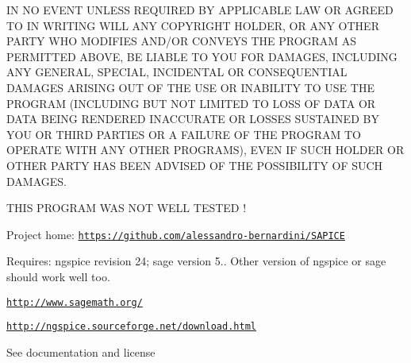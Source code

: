I\-N N\-O E\-V\-E\-N\-T U\-N\-L\-E\-S\-S R\-E\-Q\-U\-I\-R\-E\-D B\-Y A\-P\-P\-L\-I\-C\-A\-B\-L\-E L\-A\-W O\-R A\-G\-R\-E\-E\-D T\-O I\-N W\-R\-I\-T\-I\-N\-G W\-I\-L\-L A\-N\-Y C\-O\-P\-Y\-R\-I\-G\-H\-T H\-O\-L\-D\-E\-R, O\-R A\-N\-Y O\-T\-H\-E\-R P\-A\-R\-T\-Y W\-H\-O M\-O\-D\-I\-F\-I\-E\-S A\-N\-D/\-O\-R C\-O\-N\-V\-E\-Y\-S T\-H\-E P\-R\-O\-G\-R\-A\-M A\-S P\-E\-R\-M\-I\-T\-T\-E\-D A\-B\-O\-V\-E, B\-E L\-I\-A\-B\-L\-E T\-O Y\-O\-U F\-O\-R D\-A\-M\-A\-G\-E\-S, I\-N\-C\-L\-U\-D\-I\-N\-G A\-N\-Y G\-E\-N\-E\-R\-A\-L, S\-P\-E\-C\-I\-A\-L, I\-N\-C\-I\-D\-E\-N\-T\-A\-L O\-R C\-O\-N\-S\-E\-Q\-U\-E\-N\-T\-I\-A\-L D\-A\-M\-A\-G\-E\-S A\-R\-I\-S\-I\-N\-G O\-U\-T O\-F T\-H\-E U\-S\-E O\-R I\-N\-A\-B\-I\-L\-I\-T\-Y T\-O U\-S\-E T\-H\-E P\-R\-O\-G\-R\-A\-M (I\-N\-C\-L\-U\-D\-I\-N\-G B\-U\-T N\-O\-T L\-I\-M\-I\-T\-E\-D T\-O L\-O\-S\-S O\-F D\-A\-T\-A O\-R D\-A\-T\-A B\-E\-I\-N\-G R\-E\-N\-D\-E\-R\-E\-D I\-N\-A\-C\-C\-U\-R\-A\-T\-E O\-R L\-O\-S\-S\-E\-S S\-U\-S\-T\-A\-I\-N\-E\-D B\-Y Y\-O\-U O\-R T\-H\-I\-R\-D P\-A\-R\-T\-I\-E\-S O\-R A F\-A\-I\-L\-U\-R\-E O\-F T\-H\-E P\-R\-O\-G\-R\-A\-M T\-O O\-P\-E\-R\-A\-T\-E W\-I\-T\-H A\-N\-Y O\-T\-H\-E\-R P\-R\-O\-G\-R\-A\-M\-S), E\-V\-E\-N I\-F S\-U\-C\-H H\-O\-L\-D\-E\-R O\-R O\-T\-H\-E\-R P\-A\-R\-T\-Y H\-A\-S B\-E\-E\-N A\-D\-V\-I\-S\-E\-D O\-F T\-H\-E P\-O\-S\-S\-I\-B\-I\-L\-I\-T\-Y O\-F S\-U\-C\-H D\-A\-M\-A\-G\-E\-S.

T\-H\-I\-S P\-R\-O\-G\-R\-A\-M W\-A\-S N\-O\-T W\-E\-L\-L T\-E\-S\-T\-E\-D !

Project home\-: \href{https://github.com/alessandro-bernardini/SAPICE}{\tt https\-://github.\-com/alessandro-\/bernardini/\-S\-A\-P\-I\-C\-E}

Requires\-: ngspice revision 24; sage version 5.. Other version of ngspice or sage should work well too.

\href{http://www.sagemath.org/}{\tt http\-://www.\-sagemath.\-org/}

\href{http://ngspice.sourceforge.net/download.html}{\tt http\-://ngspice.\-sourceforge.\-net/download.\-html}

See documentation and license 